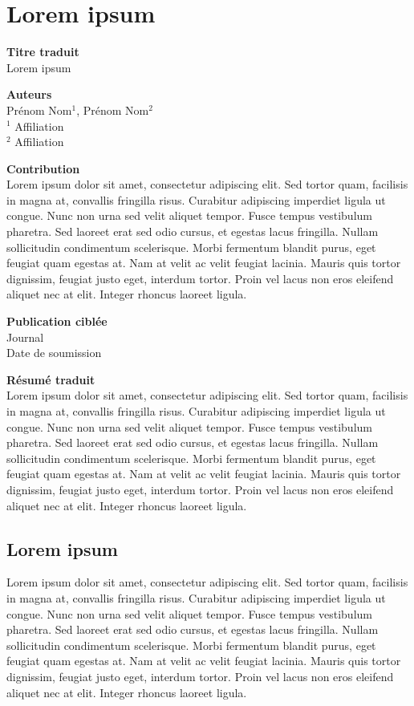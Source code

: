 \chapter{Lorem ipsum}

{\setlength{\parindent}{0cm}
\textbf{Titre traduit}
\\ Lorem ipsum

\textbf{Auteurs}
\\Prénom Nom$^1$, Prénom Nom$^2$
\\$^1$ Affiliation
\\$^2$ Affiliation

\textbf{Contribution}
\\Lorem ipsum dolor sit amet, consectetur adipiscing elit. Sed tortor quam, facilisis in magna at, convallis fringilla risus. Curabitur adipiscing imperdiet ligula ut congue. Nunc non urna sed velit aliquet tempor. Fusce tempus vestibulum pharetra. Sed laoreet erat sed odio cursus, et egestas lacus fringilla. Nullam sollicitudin condimentum scelerisque. Morbi fermentum blandit purus, eget feugiat quam egestas at. Nam at velit ac velit feugiat lacinia. Mauris quis tortor dignissim, feugiat justo eget, interdum tortor. Proin vel lacus non eros eleifend aliquet nec at elit. Integer rhoncus laoreet ligula.

\textbf{Publication ciblée}
\\Journal
\\Date de soumission

\textbf{Résumé traduit}
\\Lorem ipsum dolor sit amet, consectetur adipiscing elit. Sed tortor quam, facilisis in magna at, convallis fringilla risus. Curabitur adipiscing imperdiet ligula ut congue. Nunc non urna sed velit aliquet tempor. Fusce tempus vestibulum pharetra. Sed laoreet erat sed odio cursus, et egestas lacus fringilla. Nullam sollicitudin condimentum scelerisque. Morbi fermentum blandit purus, eget feugiat quam egestas at. Nam at velit ac velit feugiat lacinia. Mauris quis tortor dignissim, feugiat justo eget, interdum tortor. Proin vel lacus non eros eleifend aliquet nec at elit. Integer rhoncus laoreet ligula.
}

\section{Lorem ipsum}
Lorem ipsum dolor sit amet, consectetur adipiscing elit. Sed tortor quam, facilisis in magna at, convallis fringilla risus. Curabitur adipiscing imperdiet ligula ut congue. Nunc non urna sed velit aliquet tempor. Fusce tempus vestibulum pharetra. Sed laoreet erat sed odio cursus, et egestas lacus fringilla. Nullam sollicitudin condimentum scelerisque. Morbi fermentum blandit purus, eget feugiat quam egestas at. Nam at velit ac velit feugiat lacinia. Mauris quis tortor dignissim, feugiat justo eget, interdum tortor. Proin vel lacus non eros eleifend aliquet nec at elit. Integer rhoncus laoreet ligula.

